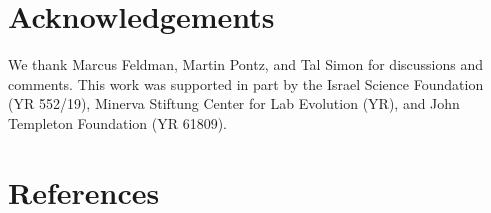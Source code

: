 \documentclass[12pt]{extarticle}
\begin{document}
{\small
\section*{Acknowledgements}
We thank Marcus Feldman, Martin Pontz, and Tal Simon for discussions and comments.
This work was supported in part by 
the Israel Science Foundation (YR 552/19),
Minerva Stiftung Center for Lab Evolution (YR),
and 
John Templeton Foundation (YR 61809).
}

\section*{References}
\nolinenumbers

%

\end{document}
